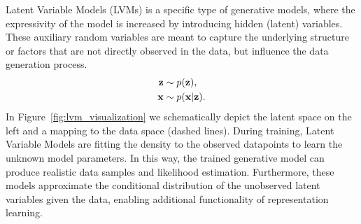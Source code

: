 Latent Variable Models (LVMs) is a specific type of generative models, where the expressivity of the model is increased by introducing hidden (latent) variables.
These auxiliary random variables are meant to capture the underlying structure or factors that are not directly observed in the data, but influence the data generation process.
\begin{equation}
\begin{aligned}
    {\mathbf{z}} &\sim p({\mathbf{z}}),\\
    {\mathbf{x}} &\sim p({\mathbf{x}}|{\mathbf{z}}).
    \end{aligned}
\end{equation}
In Figure~\ref{fig:lvm_visualization} we schematically depict the latent space on the left and a mapping to the data space (dashed lines).
During training, Latent Variable Models are fitting the density to the observed datapoints to learn the unknown model parameters.
In this way, the trained generative model can produce realistic data samples and likelihood estimation.
Furthermore, these models approximate the conditional distribution of the unobserved latent variables given the data, enabling additional functionality of representation learning. 

